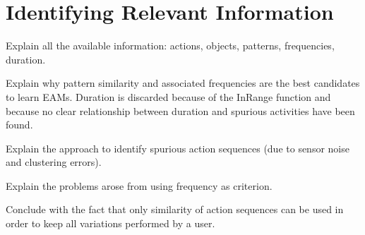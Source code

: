 \section{Identifying Relevant Information}
\label{sec:learner:relevant}

Explain all the available information: actions, objects, patterns, frequencies, duration.

Explain why pattern similarity and associated frequencies are the best candidates to learn EAMs. Duration is discarded because of the InRange function and because no clear relationship between duration and spurious activities have been found. 

Explain the approach to identify spurious action sequences (due to sensor noise and clustering errors).

Explain the problems arose from using frequency as criterion.

Conclude with the fact that only similarity of action sequences can be used in order to keep all variations performed by a user.
